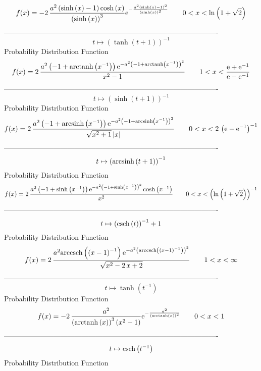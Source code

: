 \documentclass[12pt]{article}
\begin{document}
$$  f(x)=-2\,{\frac {{a}^{2} \left( \sinh \left( x \right) -1 \right) \cosh
 \left( x \right) }{ \left( \sinh \left( x \right)  \right) ^{3}}{
{\rm e}^{-{\frac {{a}^{2} \left( \sinh \left( x \right) -1 \right) ^{2
}}{ \left( \sinh \left( x \right)  \right) ^{2}}}}}}
 \qquad0
 < x < \ln  \left( 1+\sqrt {2} \right) 
$$-------------------------------------------------------------------------------------------  \\$$t\mapsto  \left( \tanh \left( t+1 \right)  \right) ^{-1}
$$Probability Distribution Function 
$$  f(x)=2\,{\frac {{a}^{2} \left( -1+{\rm arctanh} \left({x}^{-1}\right)
 \right) {{\rm e}^{-{a}^{2} \left( -1+{\rm arctanh} \left({x}^{-1}
\right) \right) ^{2}}}}{{x}^{2}-1}}
 \qquad1
 < x < {\frac {{\rm e}+{{\rm e}^{-1}}}{{\rm e}-{{\rm e}^{-1}}}}
$$-------------------------------------------------------------------------------------------  \\$$t\mapsto  \left( \sinh \left( t+1 \right)  \right) ^{-1}
$$Probability Distribution Function 
$$  f(x)=2\,{\frac {{a}^{2} \left( -1+{\rm arcsinh} \left({x}^{-1}\right)
 \right) {{\rm e}^{-{a}^{2} \left( -1+{\rm arcsinh} \left({x}^{-1}
\right) \right) ^{2}}}}{\sqrt {{x}^{2}+1} \left| x \right| }}
 \qquad0
 < x < 2\, \left( {\rm e}-{{\rm e}^{-1}} \right) ^{-1}
$$-------------------------------------------------------------------------------------------  \\$$t\mapsto  \left( {\rm arcsinh} \left(t+1\right) \right) ^{-1}
$$Probability Distribution Function 
$$  f(x)=2\,{\frac {{a}^{2} \left( -1+\sinh \left( {x}^{-1} \right)  \right) {
{\rm e}^{-{a}^{2} \left( -1+\sinh \left( {x}^{-1} \right)  \right) ^{2
}}}\cosh \left( {x}^{-1} \right) }{{x}^{2}}}
 \qquad0
 < x <  \left( \ln  \left( 1+\sqrt {2} \right)  \right) ^{-1}
$$-------------------------------------------------------------------------------------------  \\$$t\mapsto  \left( {\rm csch} \left(t\right) \right) ^{-1}+1
$$Probability Distribution Function 
$$  f(x)=2\,{\frac {{a}^{2}{\rm arccsch} \left( \left( x-1 \right) ^{-1}\right)
{{\rm e}^{-{a}^{2} \left( {\rm arccsch} \left( \left( x-1 \right) ^{-1
}\right) \right) ^{2}}}}{\sqrt {{x}^{2}-2\,x+2}}}
 \qquad1
 < x < \infty 
$$-------------------------------------------------------------------------------------------  \\$$t\mapsto \tanh \left( {t}^{-1} \right) 
$$Probability Distribution Function 
$$  f(x)=-2\,{\frac {{a}^{2}}{ \left( {\rm arctanh} \left(x\right) \right) ^{3}
 \left( {x}^{2}-1 \right) }{{\rm e}^{-{\frac {{a}^{2}}{ \left( 
{\rm arctanh} \left(x\right) \right) ^{2}}}}}}
 \qquad0
 < x < 1
$$-------------------------------------------------------------------------------------------  \\$$t\mapsto {\rm csch} \left({t}^{-1}\right)
$$Probability Distribution Function 
\end{document}
